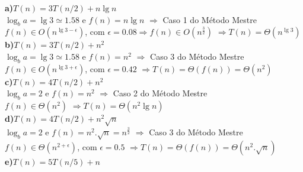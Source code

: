 \documentclass[a4paper]{exam}
\begin{document}
\begin{questions}
  \begin{solution}
    \textbf{a)$T(n) = 3T(n/2) + n\lg n$}\\
      $\log_b a = \lg 3 \simeq 1.58$ e $f(n) = n\lg n$ $\Rightarrow$  Caso 1 do Método Mestre\\
      $f(n) \in O(n^{\lg 3 - \epsilon})$, com $\epsilon = 0.08 \Rightarrow f(n) \in O(n^{\frac{3}{2}})$
      $\Rightarrow T(n) = \Theta(n^{\lg 3})$\\
    \textbf{b)$T(n) = 3T(n/2) + n^2$}\\
      $\log_b a = \lg 3 \simeq 1.58$ e $f(n) = n^2$ $\Rightarrow$  Caso 3 do Método Mestre\\
      $f(n) \in O(n^{\lg 3 + \epsilon})$, com $\epsilon = 0.42$
      $\Rightarrow T(n) = \Theta(f(n)) = \Theta(n^2)$\\
    \textbf{c)$T(n) = 4T(n/2) + n^2$}\\
      $\log_b a = 2 $ e $f(n) = n^2$ $\Rightarrow$  Caso 2 do Método Mestre\\
      $f(n) \in \Theta(n^2)$
      $\Rightarrow T(n) = \Theta(n^2 \lg n)$\\
    \textbf{d)$T(n) = 4T(n/2) + n^2\sqrt{n}$}\\
      $\log_b a = 2 $ e $f(n) = n^2.\sqrt{n} = n^{\frac{3}{2}}$ $\Rightarrow$  Caso 3 do Método Mestre\\
      $f(n) \in \Theta(n^{2 + \epsilon})$, com $\epsilon = 0.5$
      $\Rightarrow T(n) = \Theta(f(n)) = \Theta(n^2.\sqrt{n})$\\
    \textbf{e)$T(n) = 5T(n/5) + n$}\\

\end{solution}
\end{questions}
\end{document}

